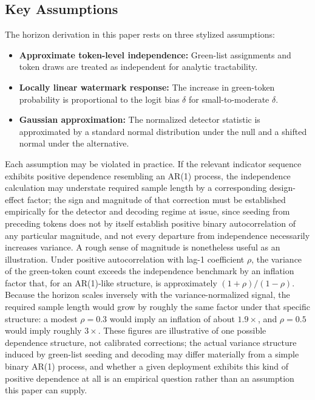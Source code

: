 \documentclass[11pt]{article}
\begin{document}
\subsection{Key Assumptions}
The horizon derivation in this paper rests on three stylized assumptions:
\begin{itemize}[leftmargin=2em]
\item \textbf{Approximate token-level independence:} Green-list assignments and
token draws are treated as independent for analytic tractability.
\item \textbf{Locally linear watermark response:} The increase in green-token
probability is proportional to the logit bias $\delta$ for small-to-moderate
$\delta$.
\item \textbf{Gaussian approximation:} The normalized detector statistic is
approximated by a standard normal distribution under the null and a shifted normal
under the alternative.
\end{itemize}
Each assumption may be violated in practice. If the relevant indicator sequence
exhibits positive dependence resembling an AR(1) process, the independence
calculation may understate required sample length by a corresponding design-effect
factor; the sign and magnitude of that correction must be established empirically
for the detector and decoding regime at issue, since seeding from preceding tokens
does not by itself establish positive binary autocorrelation of any particular
magnitude, and not every departure from independence necessarily increases
variance.
A rough sense of magnitude is nonetheless useful as an illustration. Under positive
autocorrelation with lag-1 coefficient $\rho$, the variance of the green-token
count exceeds the independence benchmark by an inflation factor that, for an
AR(1)-like structure, is approximately $(1+\rho)/(1-\rho)$. Because the horizon
scales inversely with the variance-normalized signal, the required sample length
would grow by roughly the same factor under that specific structure: a modest
$\rho = 0.3$ would imply an inflation of about $1.9\times$, and $\rho = 0.5$ would
imply roughly $3\times$. These figures are illustrative of one possible dependence
structure, not calibrated corrections; the actual variance structure induced by
green-list seeding and decoding may differ materially from a simple binary AR(1)
process, and whether a given deployment exhibits this kind of positive dependence
at all is an empirical question rather than an assumption this paper can supply.
\end{document}
